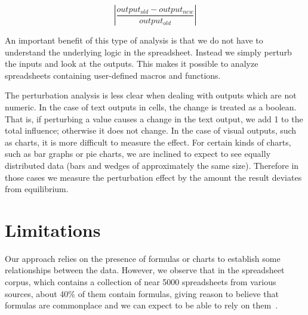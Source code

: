 \[
\left| \frac{output_{old} - output_{new}}{output_{old}} \right|
\]

An important benefit of this type of analysis is that we do not have
to understand the underlying logic in the spreadsheet.  Instead we
simply perturb the inputs and look at the outputs.  This makes it
possible to analyze spreadsheets containing user-defined macros and
functions.

The perturbation analysis is less clear when dealing with outputs
which are not numeric.  In the case of text outputs in cells, the
change is treated as a boolean.  That is, if perturbing a value causes
a change in the text output, we add 1 to the total influence;
otherwise it does not change.  In the case of visual outputs, such as
charts, it is more difficult to measure the effect.  For certain kinds
of charts, such as bar graphs or pie charts, we are inclined to expect
to see equally distributed data (bars and wedges of approximately the
same size). Therefore in those cases we measure the perturbation
effect by the amount the result deviates from equilibrium.

\section{Limitations}

Our approach relies on the presence of formulas or charts to establish
some relationships between the data.  However, we observe that in the
spreadsheet corpus, which contains a collection of near 5000
spreadsheets from various sources, about 40\% of them contain
formulas, giving reason to believe that formulas are commonplace and
we can expect to be able to rely on them~\cite{Fisher:2005:ESC:1082983.1083242}.
